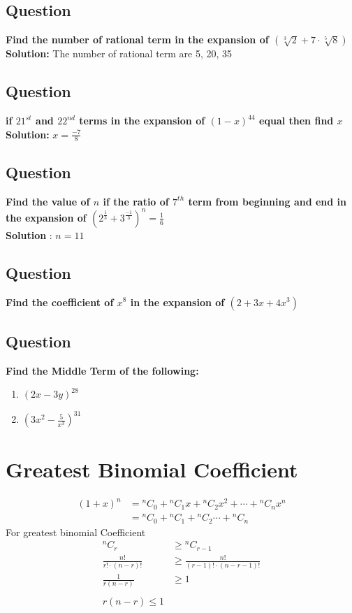 \documentclass[12pt]{article}
\begin{document}
\subsection*{Question}
\textbf{Find the number of rational term in the expansion of $(\sqrt[3]{2}+7 \cdot \sqrt[5]{8})$}\\
\textbf{Solution: }The number of rational term are 5, 20, 35

\subsection*{Question}
\textbf{if $21^{st}$ and $22^{nd}$ terms in the expansion of $(1-x)^{44}$ equal then find $x$}\\
\textbf{Solution: }
$x = \frac{-7}{8}$

\subsection*{Question}
\textbf{Find the value of $n$ if the ratio of $7^{th}$ term from beginning and end in the expansion of $\left(2^{\frac{1}{3}}+3^{\frac{-1}{3}}\right)^n = \frac{1}{6}$}\\
\textbf{Solution} : $n=11$

\subsection*{Question}
\textbf{Find the coefficient of $x^8$ in the expansion of $(2+3x+4x^3)$}

\subsection*{Question}
\textbf{Find the Middle Term of the following:}\\
\begin{enumerate}[label=\Roman*.]
    \item $(2x-3y)^{28}$
    \item $\left(3x^2-\frac{5}{x^3}\right)^{31}$
\end{enumerate}
\newpage
\section{Greatest Binomial Coefficient}
\[
\begin{aligned}
    (1+x)^n &= {}^{n}C_{0}
    + {}^{n}C_{1}x
    + {}^{n}C_{2}x^2
    + \cdots
    + {}^{n}C_{n}x^n \\
    &= {}^{n}C_{0}+{}^{n}C_{1}+{}^{n}C_{2}\cdots+{}^{n}C_{n}
\end{aligned}
\]
For greatest binomial Coefficient
\[
\begin{aligned}
    {}^{n}C_{r} &\geq {}^{n}C_{r-1}\\
    \frac{n!}{r!\cdot(n-r)!} &\geq \frac{n!}{(r-1)!\cdot(n-r-1)!}\\
    \frac{1}{r(n-r)} &\geq 1 \\ \\
     \boxed{r(n-r)  \leq 1}
\end{aligned}
\]
\end{document}
